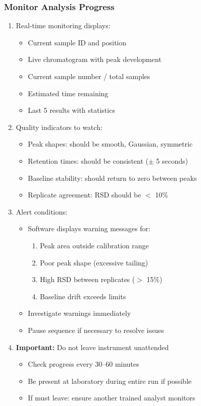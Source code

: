 \documentclass[11pt,a4paper]{article}\usepackage[]{graphicx}\usepackage[]{xcolor}
\begin{document}
\subsubsection{Monitor Analysis Progress}
\begin{enumerate}[noitemsep]
    \item Real-time monitoring displays:
    \begin{itemize}
        \item Current sample ID and position
        \item Live chromatogram with peak development
        \item Current sample number / total samples
        \item Estimated time remaining
        \item Last 5 results with statistics
    \end{itemize}
    \item Quality indicators to watch:
    \begin{itemize}
        \item Peak shapes: should be smooth, Gaussian, symmetric
        \item Retention times: should be consistent ($\pm$ 5 seconds)
        \item Baseline stability: should return to zero between peaks
        \item Replicate agreement: RSD should be $<$ 10\%
    \end{itemize}
    \item Alert conditions:
    \begin{itemize}
        \item Software displays warning messages for:
        \begin{enumerate}
            \item Peak area outside calibration range
            \item Poor peak shape (excessive tailing)
            \item High RSD between replicates ($>$ 15\%)
            \item Baseline drift exceeds limits
        \end{enumerate}
        \item Investigate warnings immediately
        \item Pause sequence if necessary to resolve issues
    \end{itemize}
    \item \textbf{Important:} Do not leave instrument unattended
    \begin{itemize}
        \item Check progress every 30--60 minutes
        \item Be present at laboratory during entire run if possible
        \item If must leave: ensure another trained analyst monitors
    \end{itemize}
\end{enumerate}
\end{document}
